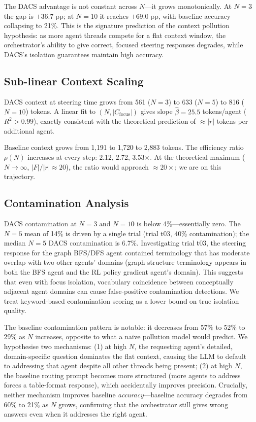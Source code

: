 \documentclass{article}
\begin{document}
The DACS advantage is not constant across $N$—it grows monotonically.
At $N=3$ the gap is $+36.7$ pp; at $N=10$ it reaches $+69.0$ pp, with
baseline accuracy collapsing to 21\%.
This is the signature prediction of the context pollution hypothesis:
as more agent threads compete for a flat context window, the
orchestrator's ability to give correct, focused steering responses
degrades, while DACS's isolation guarantees maintain high accuracy.

\subsection{Sub-linear Context Scaling}
\label{sec:scaling}

DACS context at steering time grows from 561 ($N=3$) to 633 ($N=5$) to
816 ($N=10$) tokens.
A linear fit to $(N, |C_{\text{focus}}|)$ gives slope $\hat{\beta} = 25.5$
tokens/agent ($R^2 > 0.99$), exactly consistent with the theoretical
prediction of $\approx |r|$ tokens per additional agent.

Baseline context grows from 1{,}191 to 1{,}720 to 2{,}883 tokens.
The efficiency ratio $\rho(N)$ increases at every step: 2.12, 2.72,
3.53$\times$.
At the theoretical maximum ($N \to \infty$, $|F|/|r| \approx 20$), the
ratio would approach $\approx 20\times$; we are on this trajectory.

\subsection{Contamination Analysis}

DACS contamination at $N=3$ and $N=10$ is below 4\%—essentially zero.
The $N=5$ mean of 14\% is driven by a single trial (trial t03, 40\%
contamination); the median $N=5$ DACS contamination is 6.7\%.
Investigating trial t03, the steering response for the graph BFS/DFS agent
contained terminology that has moderate overlap with two other agents'
domains (graph structure terminology appears in both the BFS agent and
the RL policy gradient agent's domain).
This suggests that even with focus isolation, vocabulary coincidence
between conceptually adjacent agent domains can cause false-positive
contamination detections.
We treat keyword-based contamination scoring as a lower bound on true
isolation quality.

The baseline contamination pattern is notable: it decreases from 57\% to
52\% to 29\% as $N$ increases, opposite to what a naïve pollution model
would predict.
We hypothesise two mechanisms: (1) at high $N$, the requesting agent's
detailed, domain-specific question dominates the flat context, causing
the LLM to default to addressing that agent despite all other threads
being present; (2) at high $N$, the baseline routing prompt becomes more
structured (more agents to address forces a table-format response), which
accidentally improves precision.
Crucially, neither mechanism improves baseline \emph{accuracy}—baseline
accuracy degrades from 60\% to 21\% as $N$ grows, confirming that the
orchestrator still gives wrong answers even when it addresses the right
agent.
\end{document}

